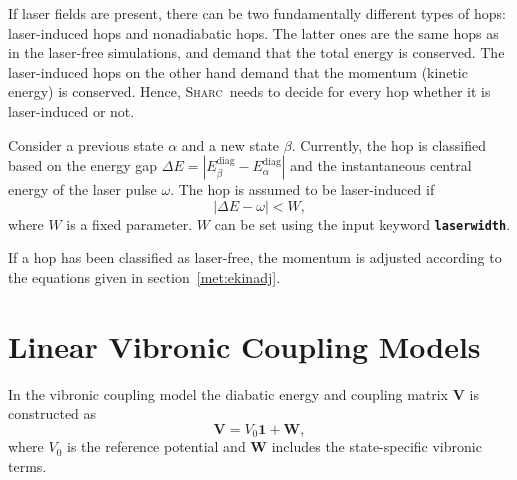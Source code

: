 \documentclass[a4paper,10pt,DIV=15,openany]{scrbook}
\newcommand{\sharc}{\textsc{Sharc}}
\newcommand{\ttt}[1]{\textbf{\texttt{#1}}}
\begin{document}
If laser fields are present, there can be two fundamentally different types of hops: laser-induced hops and nonadiabatic hops. The latter ones are the same hops as in the laser-free simulations, and demand that the total energy is conserved. The laser-induced hops on the other hand demand that the momentum (kinetic energy) is conserved. Hence, \sharc\ needs to decide for every hop whether it is laser-induced or not. 

Consider a previous state $\alpha$ and a new state $\beta$. Currently, the hop is classified based on the energy gap $\Delta E=|E_\beta^\text{diag}-E_\alpha^\text{diag}|$ and the instantaneous central energy of the laser pulse $\omega$. 
The hop is assumed to be laser-induced if
\begin{equation}
  |\Delta E-\omega| < W,
\end{equation}
where $W$ is a fixed parameter. $W$ can be set using the input keyword \ttt{laserwidth}.

If a hop has been classified as laser-free, the momentum is adjusted according to the equations given in section~\ref{met:ekinadj}.


\section{Linear Vibronic Coupling Models}\label{met:lvc}

In the vibronic coupling model \cite{Koeppel84ACP} the diabatic energy and coupling matrix $\mathbf{V}$ is constructed as
\begin{equation}
\label{eq:V}
\mathbf{V}=
V_0\mathbf{1}+\mathbf{W},
\end{equation}
where $V_0$ is the reference potential and $\mathbf{W}$ includes the state-specific vibronic terms.
\end{document}
